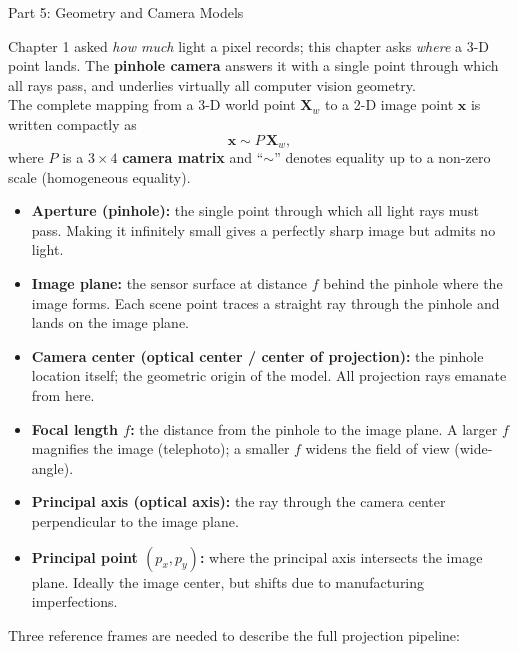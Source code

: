 \documentclass[letterpaper]{article}
\begin{document}
\begin{notes}{Part 5: Geometry and Camera Models}
\columnbreaknofill


Chapter 1 asked \emph{how much} light a pixel records; this chapter asks \emph{where} a 3-D point lands. The \textbf{pinhole camera} answers it with a single point through which all rays pass, and underlies virtually all computer vision geometry.\\

The complete mapping from a 3-D world point $\mathbf{X}_w$ to a 2-D image
point $\mathbf{x}$ is written compactly as
\[
  \mathbf{x} \sim P\,\mathbf{X}_w,
\]
where $P$ is a $3\times 4$ \textbf{camera matrix} and ``$\sim$'' denotes
equality up to a non-zero scale (homogeneous equality).



\begin{itemize}[noitemsep]
  \item \textbf{Aperture (pinhole):} the single point through which all light
        rays must pass.  Making it infinitely small gives a perfectly sharp
        image but admits no light.
  \item \textbf{Image plane:} the sensor surface at distance $f$ behind the
        pinhole where the image forms.  Each scene point traces a straight ray
        through the pinhole and lands on the image plane.
  \item \textbf{Camera center (optical center / center of projection):} the
        pinhole location itself; the geometric origin of the model.  All
        projection rays emanate from here.
  \item \textbf{Focal length $f$:} the distance from the pinhole to the image
        plane.  A larger $f$ magnifies the image (telephoto); a smaller $f$
        widens the field of view (wide-angle).
  \item \textbf{Principal axis (optical axis):} the ray through the camera
        center perpendicular to the image plane.
  \item \textbf{Principal point $(p_x, p_y)$:} where the principal axis
        intersects the image plane.  Ideally the image center, but shifts due
        to manufacturing imperfections.
\end{itemize}


Three reference frames are needed to describe the full projection pipeline:


\end{notes}
\end{document}

